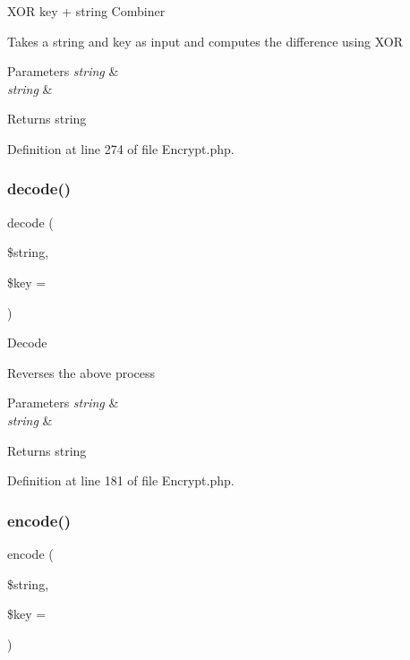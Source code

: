 X\+OR key + string Combiner

Takes a string and key as input and computes the difference using X\+OR


\begin{DoxyParams}{Parameters}
{\em string} & \\
\hline
{\em string} & \\
\hline
\end{DoxyParams}
\begin{DoxyReturn}{Returns}
string 
\end{DoxyReturn}


Definition at line 274 of file Encrypt.\+php.

\mbox{\label{class_c_i___encrypt_a54562258204ebec3d699eed228c51199}} 
\subsubsection{\texorpdfstring{decode()}{decode()}}
{\footnotesize\ttfamily decode (\begin{DoxyParamCaption}\item[{}]{\$string,  }\item[{}]{\$key = {\ttfamily \textquotesingle{}\textquotesingle{}} }\end{DoxyParamCaption})}

Decode

Reverses the above process


\begin{DoxyParams}{Parameters}
{\em string} & \\
\hline
{\em string} & \\
\hline
\end{DoxyParams}
\begin{DoxyReturn}{Returns}
string 
\end{DoxyReturn}


Definition at line 181 of file Encrypt.\+php.

\mbox{\label{class_c_i___encrypt_a6320fc999db614bc009690cc4867e238}} 
\subsubsection{\texorpdfstring{encode()}{encode()}}
{\footnotesize\ttfamily encode (\begin{DoxyParamCaption}\item[{}]{\$string,  }\item[{}]{\$key = {\ttfamily \textquotesingle{}\textquotesingle{}} }\end{DoxyParamCaption})}


